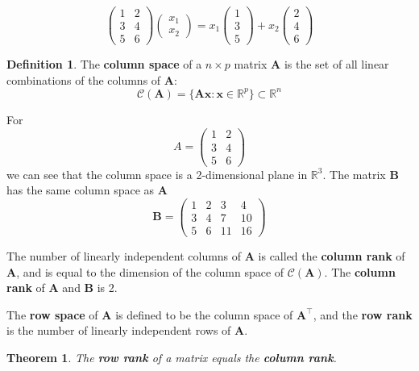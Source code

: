 \documentclass[]{book}
\newtheorem{theorem}{Theorem}[chapter]
\theoremstyle{definition}
\newtheorem{definition}{Definition}[chapter]
\theoremstyle{definition}
\theoremstyle{definition}
\theoremstyle{remark}
\begin{document}
\[ \left( \begin{array}{cc} 1 & 2\\ 3&4\\5&6\end{array}\right) \left(\begin{array}{c}x_1\\ x_2\end{array}\right) = x_1\left(\begin{array}{c}1\\3\\5 \end{array}\right)+x_2\left(\begin{array}{c}2\\4\\6 \end{array}\right)\]

\begin{definition}
\protect\hypertarget{def:rank}{}{\label{def:rank} }The \textbf{column space} of a \(n\times p\) matrix \(\mathbf A\) is the set of all linear combinations of the columns of \(\mathbf A\):
\[\mathcal{C}(\mathbf A) = \{\mathbf A\mathbf x:  \mathbf x\in \mathbb{R}^p\}\subset \mathbb{R}^n\]
\end{definition}

For \[A=\left( \begin{array}{cc} 1 & 2\\ 3&4\\5&6\end{array}\right) \] we can see that the column space is a 2-dimensional plane in \(\mathbb{R}^3\). The matrix \(\mathbf B\) has the same column space as \(\mathbf A\)
\[\mathbf B=\left( \begin{array}{cccc} 1 & 2&3 &4\\ 3&4 &7&10\\5&6&11&16\end{array}\right) \]

The number of linearly independent columns of \(\mathbf A\) is called the \textbf{column rank} of \(\mathbf A\), and is equal to the dimension of the column space of \(\mathcal{C}(\mathbf A)\). The \textbf{column rank} of \(\mathbf A\) and \(\mathbf B\) is 2.

The \textbf{row space} of \(\mathbf A\) is defined to be the column space of \(\mathbf A^\top\), and the \textbf{row rank} is the number of linearly independent rows of \(\mathbf A\).

\begin{theorem}
\protect\hypertarget{thm:rowrank}{}{\label{thm:rowrank} }The \textbf{row rank} of a matrix equals the \textbf{column rank}.
\end{theorem}
\end{document}
